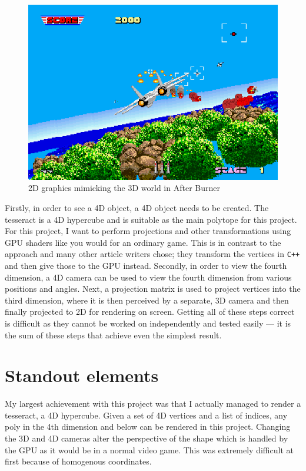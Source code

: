 \documentclass[11pt, a4paper]{article}
\begin{document}
\begin{figure}[!h]
  \centering
  \includegraphics[width=12cm]{img/after_burner.png}
  \caption{2D graphics mimicking the 3D world in After Burner \parencite{awesome2016arcade}}
  \label{fig:afterburner}
\end{figure}

Firstly, in order to see a 4D object, a 4D object needs to be created. The tesseract is a 4D hypercube and is suitable as the main polytope for this project. For this project, I want to perform projections and other transformations using GPU shaders like you would for an ordinary game. This is in contrast to the approach \citeauthor*{hollasch1991four} \parencite*{hollasch1991four} and many other article writers chose; they transform the vertices in \texttt{C++} and then give those to the GPU instead. Secondly, in order to view the fourth dimension, a 4D camera can be used to view the fourth dimension from various positions and angles. Next, a projection matrix is used to project vertices into the third dimension, where it is then perceived by a separate, 3D camera and then finally projected to 2D for rendering on screen. Getting all of these steps correct is difficult as they cannot be worked on independently and tested easily --- it is the sum of these steps that achieve even the simplest result.

\section{Standout elements}
\label{sec:standoutElements}

My largest achievement with this project was that I actually managed to render a tesseract, a 4D hypercube. Given a set of 4D vertices and a list of indices, any poly in the 4th dimension and below can be rendered in this project. Changing the 3D and 4D cameras alter the perspective of the shape which is handled by the GPU as it would be in a normal video game. This was extremely difficult at first because of homogenous coordinates.
\end{document}
